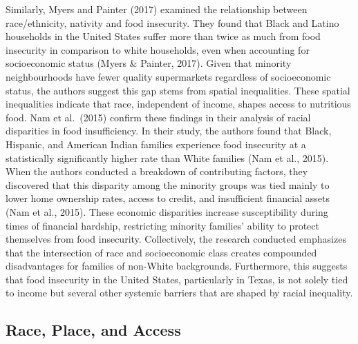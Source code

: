 \documentclass[]{article}
\begin{document}
Similarly, Myers and Painter (2017) examined the relationship between
race/ethnicity, nativity and food insecurity. They found that Black and
Latino households in the United States suffer more than twice as much
from food insecurity in comparison to white households, even when
accounting for socioeconomic status (Myers \& Painter, 2017). Given that
minority neighbourhoods have fewer quality supermarkets regardless of
socioeconomic status, the authors suggest this gap stems from spatial
inequalities. These spatial inequalities indicate that race, independent
of income, shapes access to nutritious food. Nam et al.~(2015) confirm
these findings in their analysis of racial disparities in food
insufficiency. In their study, the authors found that Black, Hispanic,
and American Indian families experience food insecurity at a
statistically significantly higher rate than White families (Nam et al.,
2015). When the authors conducted a breakdown of contributing factors,
they discovered that this disparity among the minority groups was tied
mainly to lower home ownership rates, access to credit, and insufficient
financial assets (Nam et al., 2015). These economic disparities increase
susceptibility during times of financial hardship, restricting minority
families' ability to protect themselves from food insecurity.
Collectively, the research conducted emphasizes that the intersection of
race and socioeconomic class creates compounded disadvantages for
families of non-White backgrounds. Furthermore, this suggests that food
insecurity in the United States, particularly in Texas, is not solely
tied to income but several other systemic barriers that are shaped by
racial inequality.

\subsection{Race, Place, and Access}\label{race-place-and-access}
\end{document}
